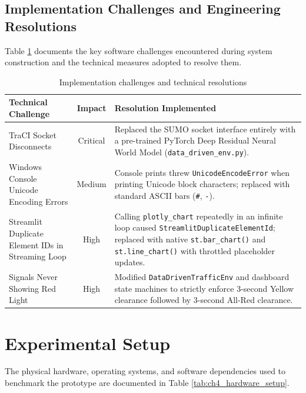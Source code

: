 \documentclass[12pt,a4paper,oneside]{report}
\begin{document}
\subsection{Implementation Challenges and Engineering Resolutions}
Table \ref{tab:ch4_challenges} documents the key software challenges encountered during system construction and the technical measures adopted to resolve them.

\begin{table}[htbp]
\centering
\small
\caption{Implementation challenges and technical resolutions}
\label{tab:ch4_challenges}
\begin{tabularx}{\textwidth}{|p{3.5cm}|c|X|}
\hline
\textbf{Technical Challenge} & \textbf{Impact} & \textbf{Resolution Implemented} \\ \hline
TraCI Socket Disconnects & Critical & Replaced the SUMO socket interface entirely with a pre-trained PyTorch Deep Residual Neural World Model (\texttt{data\_driven\_env.py}). \\ \hline
Windows Console Unicode Encoding Errors & Medium & Console prints threw \texttt{UnicodeEncodeError} when printing Unicode block characters; replaced with standard ASCII bars (\texttt{\#}, \texttt{-}). \\ \hline
Streamlit Duplicate Element IDs in Streaming Loop & High & Calling \texttt{plotly\_chart} repeatedly in an infinite loop caused \texttt{StreamlitDuplicateElementId}; replaced with native \texttt{st.bar\_chart()} and \texttt{st.line\_chart()} with throttled placeholder updates. \\ \hline
Signals Never Showing Red Light & High & Modified \texttt{DataDrivenTrafficEnv} and dashboard state machines to strictly enforce 3-second Yellow clearance followed by 3-second All-Red clearance. \\ \hline
\end{tabularx}
\end{table}

\section{Experimental Setup}
\label{sec:ch4_exp_setup}
The physical hardware, operating systems, and software dependencies used to benchmark the prototype are documented in Table \ref{tab:ch4_hardware_setup}.
\end{document}
